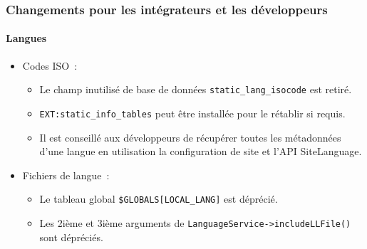 \begin{frame}[fragile]
	\frametitle{Changements pour les intégrateurs et les développeurs}
	\framesubtitle{Langues}

	\begin{itemize}
		\item Codes ISO~:

			\begin{itemize}
				\item Le champ inutilisé de base de données \texttt{static\_lang\_isocode} est retiré.
				\item \texttt{EXT:static\_info\_tables} peut être installée pour le rétablir si requis.
				\item Il est conseillé aux développeurs de récupérer toutes les métadonnées d'une langue
					en utilisation la configuration de site et l'API SiteLanguage.
			\end{itemize}

		\item Fichiers de langue~:

			\begin{itemize}
				\item Le tableau global \texttt{\$GLOBALS[LOCAL\_LANG]} est déprécié.
				\item Les 2ième et 3ième arguments de \texttt{LanguageService->includeLLFile()} sont dépréciés.
			\end{itemize}

	\end{itemize}

\end{frame}


